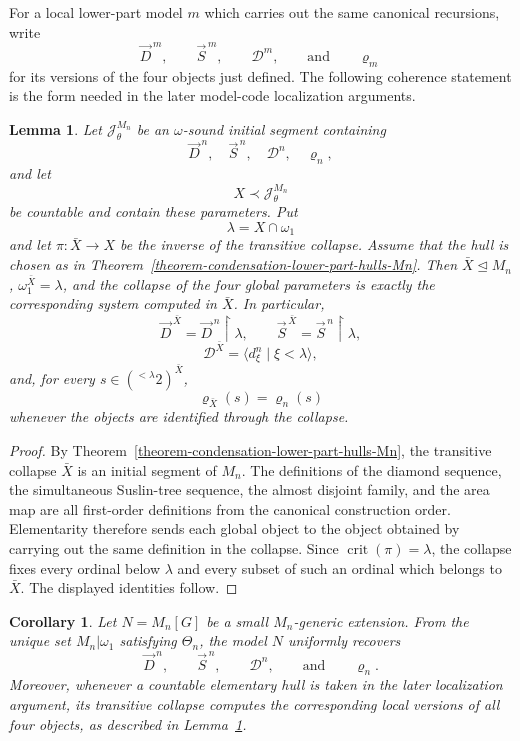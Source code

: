 \documentclass[a4paper,11pt]{article}
\newtheorem{lemma}[theorem]{Lemma}
\newtheorem{corollary}[theorem]{Corollary}
\begin{document}
For a local lower-part model $m$ which carries out the same canonical
recursions, write
\[
   \vec D^{\,m},\qquad
   \vec S^{\,m},\qquad
   \mathcal D^m,
   \qquad\text{and}\qquad
   \varrho_m
\]
for its versions of the four objects just defined.  The following coherence
statement is the form needed in the later model-code localization arguments.

\begin{lemma}
\label{lemma-condensation-coherence-canonical-Mn-parameters}
Let $\mathcal J^{M_n}_\theta$ be an $\omega$-sound initial segment containing
\[
   \vec D^{\,n},\quad
   \vec S^{\,n},\quad
   \mathcal D^n,\quad
   \varrho_n,
\]
and let
\[
   X\prec\mathcal J^{M_n}_\theta
\]
be countable and contain these parameters.  Put
\[
   \lambda=X\cap\omega_1
\]
and let $\pi:\bar X\to X$ be the inverse of the transitive collapse.  Assume
that the hull is chosen as in
Theorem~\ref{theorem-condensation-lower-part-hulls-Mn}.  Then
$\bar X\trianglelefteq M_n$, $\omega_1^{\bar X}=\lambda$, and the collapse of
the four global parameters is exactly the corresponding system computed in
$\bar X$.  In particular,
\[
   \vec D^{\,\bar X}=\vec D^{\,n}\restriction\lambda,
   \qquad
   \vec S^{\,\bar X}=\vec S^{\,n}\restriction\lambda,
\]
\[
   \mathcal D^{\bar X}
      =\langle d^n_\xi\mid\xi<\lambda\rangle,
\]
and, for every
$s\in({}^{<\lambda}2)^{\bar X}$,
\[
   \varrho_{\bar X}(s)=\varrho_n(s)
\]
whenever the objects are identified through the collapse.
\end{lemma}

\begin{proof}
By Theorem~\ref{theorem-condensation-lower-part-hulls-Mn}, the transitive
collapse $\bar X$ is an initial segment of $M_n$.  The definitions of the
diamond sequence, the simultaneous Suslin-tree sequence, the almost disjoint
family, and the area map are all first-order definitions from the canonical
construction order.  Elementarity therefore sends each global object to the
object obtained by carrying out the same definition in the collapse.  Since
$\operatorname{crit}(\pi)=\lambda$, the collapse fixes every ordinal below
$\lambda$ and every subset of such an ordinal which belongs to $\bar X$.
The displayed identities follow.
\end{proof}

\begin{corollary}
\label{corollary-uniform-availability-canonical-Mn-parameters}
Let $N=M_n[G]$ be a small $M_n$-generic extension.  From the unique set
$M_n|\omega_1$ satisfying $\Theta_n$, the model $N$ uniformly
recovers
\[
   \vec D^{\,n},\qquad
   \vec S^{\,n},\qquad
   \mathcal D^n,
   \qquad\text{and}\qquad
   \varrho_n.
\]
Moreover, whenever a countable elementary hull is taken in the later
localization argument, its transitive collapse computes the corresponding local
versions of all four objects, as described in
Lemma~\ref{lemma-condensation-coherence-canonical-Mn-parameters}.
\end{corollary}
\end{document}
